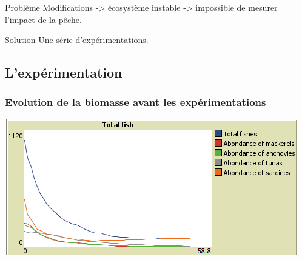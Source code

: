 \documentclass[t, 10pt]{beamer}
\begin{document}
        \begin{frame}[c]
          \begin{alertblock}{Problème}
            Modifications -> écosystème instable -> impossible de mesurer l'impact de la pêche.
          \end{alertblock}

          \pause
          
	  \begin{block}{Solution}
	    Une série d'expérimentations.
	  \end{block}
        \end{frame}
        
	\subsection{L'expérimentation}
	
        \begin{frame}[c]
          \frametitle{Evolution de la biomasse avant les expérimentations}
          \includegraphics[width=\textwidth]{img/etape1.png}
        \end{frame}
\end{document}

